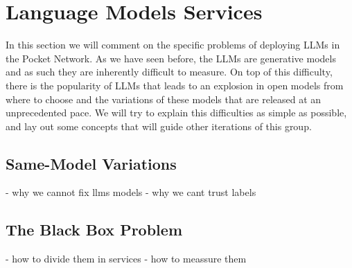 \section{Language Models Services}\label{sec:ref}
In this section we will comment on the specific problems of deploying LLMs in the Pocket Network. As we have seen before, the LLMs are generative models and as such they are inherently difficult to measure. On top of this difficulty, there is the popularity of LLMs that leads to an explosion in open models from where to choose and the variations of these models that are released at an unprecedented pace. We will try to explain this difficulties as simple as possible, and lay out some concepts that will guide other iterations of this group.

\subsection{Same-Model Variations}
- why we cannot fix llms models
- why we cant trust labels

\subsection{The Black Box Problem}
- how to divide them in services
- how to meassure them
